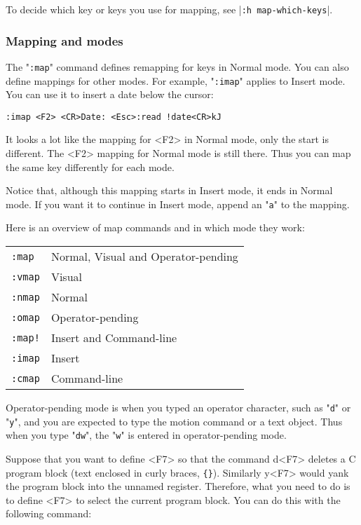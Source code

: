 To decide which key or keys you use for mapping, see |\texttt{:h map-which-keys}|.

\subsubsection{Mapping and modes}
The "\texttt{:map}" command defines remapping for keys in Normal mode.
You can also define mappings for other modes.
For example, "\texttt{:imap}" applies to Insert mode.
You can use it to insert a date below the cursor:

\begin{Verbatim}[samepage=true]
 :imap <F2> <CR>Date: <Esc>:read !date<CR>kJ
\end{Verbatim}

It looks a lot like the mapping for <F2> in Normal mode, only the start is different.
The <F2> mapping for Normal mode is still there.
Thus you can map the same key differently for each mode.

Notice that, although this mapping starts in Insert mode, it ends in Normal mode.
If you want it to continue in Insert mode, append an "\texttt{a}" to the mapping.

Here is an overview of map commands and in which mode they work:
\begin{center} \begin{tabular}{l l}
				\texttt{:map} & Normal, Visual and Operator-pending \\
				\texttt{:vmap} & Visual \\
				\texttt{:nmap} & Normal \\
				\texttt{:omap} & Operator-pending \\
				\texttt{:map!} & Insert and Command-line \\
				\texttt{:imap} & Insert \\
				\texttt{:cmap} & Command-line \\
\end{tabular} \end{center}

Operator-pending mode is when you typed an operator character, such as "\texttt{d}" or "\texttt{y}", and you are expected to type the motion command or a text object.
Thus when you type "\texttt{dw}", the "\texttt{w}" is entered in operator-pending mode.

Suppose that you want to define <F7> so that the command d<F7> deletes a C program block (text enclosed in curly braces, \texttt{\{\}}).
Similarly y<F7> would yank the program block into the unnamed register.
Therefore, what you need to do is to define <F7> to select the current program block.
You can do this with the following command:

